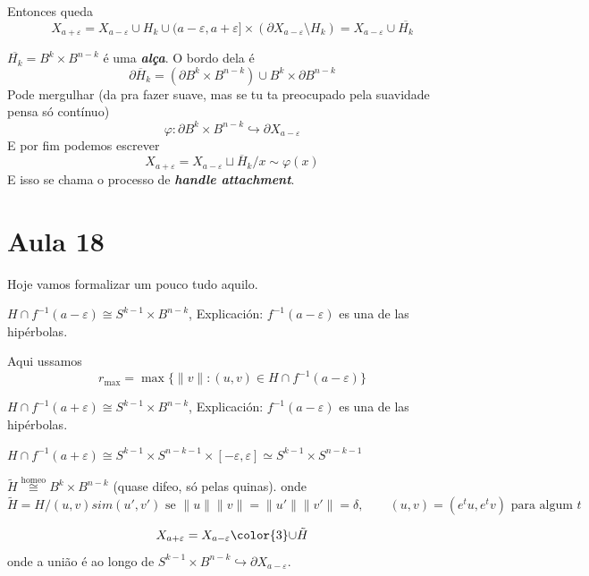 Entonces queda
\[X_{a+ \varepsilon}= X_{a- \varepsilon} \cup  H_k \cup  (a - \varepsilon, a+\varepsilon]\times(\partial X_{a-\varepsilon}\setminus H_k)=X_{a - \varepsilon}\cup \overline{H_k}\]

\(\overline{H_k}=B^k \times B^{n-k}\) é uma \textit{\textbf{alça}}. O bordo dela é
\[\partial \overline{H}_k=(\partial B^k \times B^{n-k}) \cup  B^k \times \partial B^{n-k}\]
Pode mergulhar (da pra fazer suave, mas se tu ta preocupado pela suavidade pensa só contínuo)
\[\varphi: \partial B^k \times B^{n-k}\hookrightarrow \partial X_{a-\varepsilon}\]
E por fim podemos escrever
\[X_{a+\varepsilon}=X_{a-\varepsilon} \sqcup \overline{H}_k \Big/x \sim \varphi(x)\]
E isso se chama o processo de \textit{\textbf{handle attachment}}.

\section{Aula 18}

Hoje vamos formalizar um pouco tudo aquilo.

\begin{claim}\leavevmode
\(H \cap f^{-1}(a-\varepsilon) \cong S^{k-1} \times B^{n-k}\), Explicación: \(f^{-1}(a-\varepsilon)\) es una de las hipérbolas.
\end{claim}

Aqui ussamos
\[r_{\operatorname{max}}=\operatorname{max}\{\|v\|: (u,v) \in H \cap f^{-1}(a-\varepsilon)\}\]

\begin{claim}\leavevmode
\(H \cap f^{-1}(a+\varepsilon) \cong S^{k-1} \times B^{n-k}\), Explicación: \(f^{-1}(a-\varepsilon)\) es una de las hipérbolas.
\end{claim}
\begin{claim}\leavevmode
	\(H \cap f^{-1}(a+\varepsilon) \cong S^{k-1}\times S^{n-k-1}\times[-\varepsilon,\varepsilon] \simeq S^{k-1}\times S^{n-k-1}\)
\end{claim}

\begin{exercise}\leavevmode
\(\tilde{H} \overset{\operatorname{hom e o}}{\cong}B^k \times B^{n-k}\) (quase difeo, só pelas quinas). onde
\[\tilde{H}=H \Big/ (u,v) sim (u',v') \text{ se } \|u\|\|v\|=\|u'\|\|v'\|=\delta,\qquad (u,v)=(e^{t}u,e^tv) \text{ para algum \(t\)}  \]
\end{exercise}

\[X_{a+\varepsilon}=X_{a-\varepsilon} {\color{3}\cup }\tilde{H}\]
onde a união é ao longo de \(S^{k-1}\times B^{n-k} \hookrightarrow  \partial X_{a-\varepsilon}\).

